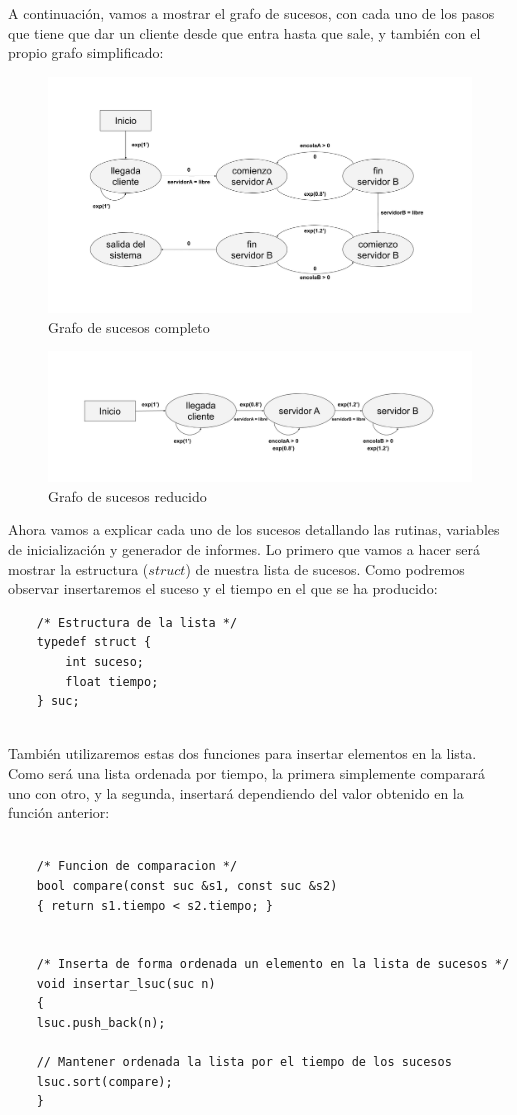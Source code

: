 \documentclass[11pt,a4paper]{article}
\begin{document}
A continuación, vamos a mostrar el grafo de sucesos, con cada uno de los pasos que tiene que dar un cliente desde que entra hasta que sale, y también con el
propio grafo simplificado:
\begin{figure}[H]
	\centering
	\includegraphics[scale=0.35]{img/grafo.png}
	\caption{Grafo de sucesos completo}
\end{figure}

\begin{figure}[H]
	\centering
	\includegraphics[scale=0.35]{img/grafo-reducido.png}
	\caption{Grafo de sucesos reducido}
\end{figure}

Ahora vamos a explicar cada uno de los sucesos detallando las rutinas, variables de inicialización y generador de informes. Lo primero que vamos a hacer será
mostrar la estructura ($struct$) de nuestra lista de sucesos. Como podremos observar insertaremos el suceso y el tiempo en el que se ha producido:
\begin{lstlisting}
	/* Estructura de la lista */
	typedef struct {
		int suceso;
		float tiempo;
	} suc;
	
\end{lstlisting}

También utilizaremos estas dos funciones para insertar elementos en la lista. Como será una lista ordenada por tiempo, la primera simplemente comparará uno con
otro, y la segunda, insertará dependiendo del valor obtenido en la función anterior:
\begin{lstlisting}

	/* Funcion de comparacion */
	bool compare(const suc &s1, const suc &s2)
	{ return s1.tiempo < s2.tiempo; }


	/* Inserta de forma ordenada un elemento en la lista de sucesos */
	void insertar_lsuc(suc n)
	{
	lsuc.push_back(n);

	// Mantener ordenada la lista por el tiempo de los sucesos
	lsuc.sort(compare);
	}
	
\end{lstlisting}
\end{document}
